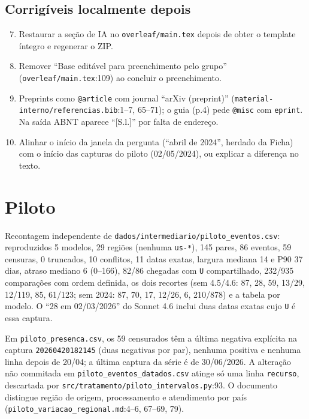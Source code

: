 \documentclass[11pt,a4paper]{article}
\newcommand{\arq}[1]{\nolinkurl{#1}}
\begin{document}
\subsection*{Corrigíveis localmente depois}

\begin{enumerate}\setcounter{enumi}{6}
\item Restaurar a seção de IA no \arq{overleaf/main.tex} depois de obter o template íntegro e regenerar o ZIP.
\item Remover ``Base editável para preenchimento pelo grupo'' (\arq{overleaf/main.tex}:109) ao concluir o preenchimento.
\item Preprints como \texttt{@article} com journal ``arXiv (preprint)'' (\arq{material-interno/referencias.bib}:1--7, 65--71); o guia (p.4) pede \texttt{@misc} com \texttt{eprint}. Na saída ABNT aparece ``[S.l.]'' por falta de endereço.
\item Alinhar o início da janela da pergunta (``abril de 2024'', herdado da Ficha) com o início das capturas do piloto (02/05/2024), ou explicar a diferença no texto.
\end{enumerate}

\section{Piloto}

Recontagem independente de \arq{dados/intermediario/piloto_eventos.csv}: reproduzidos 5 modelos, 29 regiões (nenhuma \texttt{us-*}), 145 pares, 86 eventos, 59 censuras, 0 truncados, 10 conflitos, 11 datas exatas, largura mediana 14 e P90 37 dias, atraso mediano 6 (0--166), 82/86 chegadas com \texttt{U} compartilhado, 232/935 comparações com ordem definida, os dois recortes (sem 4.5/4.6: 87, 28, 59, 13/29, 12/119, 85, 61/123; sem 2024: 87, 70, 17, 12/26, 6, 210/878) e a tabela por modelo. O ``28 em 02/03/2026'' do Sonnet 4.6 inclui duas datas exatas cujo \texttt{U} é essa captura.

Em \arq{piloto_presenca.csv}, os 59 censurados têm a última negativa explícita na captura \texttt{20260420182145} (duas negativas por par), nenhuma positiva e nenhuma linha depois de 20/04; a última captura da série é de 30/06/2026. A alteração não commitada em \arq{piloto_eventos_datados.csv} atinge só uma linha \texttt{recurso}, descartada por \arq{src/tratamento/piloto_intervalos.py}:93. O documento distingue região de origem, processamento e atendimento por país (\arq{piloto_variacao_regional.md}:4--6, 67--69, 79).
\end{document}
